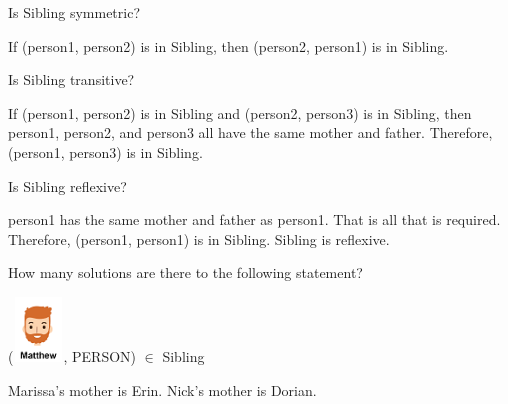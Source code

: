 \documentclass{ximera}
\begin{document}
\begin{exercise}
Is Sibling symmetric?

  \begin{multipleChoice}
  \end{multipleChoice}
  \begin{feedback}
If (person1, person2) is in Sibling, then (person2, person1) is in Sibling.
  \end{feedback}
\end{exercise}





\begin{exercise}
Is Sibling transitive?

  \begin{multipleChoice}
  \end{multipleChoice}
  \begin{feedback}
If (person1, person2) is in Sibling and (person2, person3) is in Sibling, then person1, person2, and person3 all have the same mother and father. Therefore, (person1, person3) is in Sibling.
  \end{feedback}
\end{exercise}




\begin{exercise}
Is Sibling reflexive?

  \begin{multipleChoice}
  \end{multipleChoice}
  \begin{feedback}
  person1 has the same mother and father as person1.  That is all that is required.  Therefore, (person1, person1) is in Sibling. Sibling is reflexive.
  \end{feedback}
\end{exercise}



\begin{exercise}
How many solutions are there to the following statement?  

({\includegraphics[width=50px,height=65px]{pics/people/matthew.png}}, PERSON) $\in$ Sibling 



  \begin{feedback}
Marissa's mother is Erin. Nick's mother is Dorian.
  \end{feedback}
\end{exercise}
\end{document}
